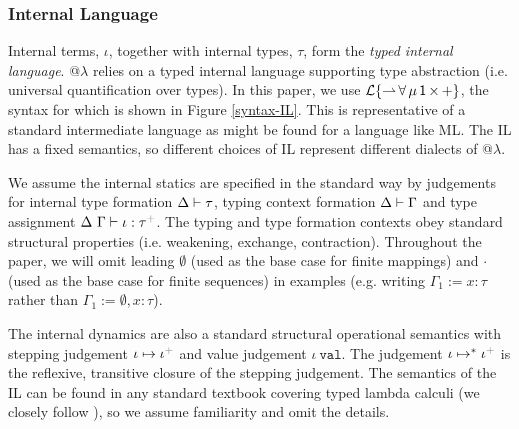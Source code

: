 \documentclass{llncs}
\newcommand{\moutput}{^{\color{gray}+}}
\begin{document}
\vspace{-10px}
\subsubsection{Internal Language} Internal terms, $\iota$, together with internal types, $\tau$, form the \emph{typed internal language}. @$\lambda$ relies on a typed internal language supporting type abstraction (i.e. universal quantification over types). In this paper, we use {$\mathcal{L}\{{\rightharpoonup}\,{\forall}\,{\mu}\,{{\sf 1}}\,{\times}\,{+}\}$}, the syntax for which is shown in Figure \ref{syntax-IL}. This is representative of a  standard intermediate language as might be found for a language like ML. The IL has a fixed semantics, so different choices of IL represent different dialects of @$\lambda$. 

We assume the internal statics are specified in the standard way by judgements for internal type formation {$\Delta \vdash \tau$}, typing context formation { $\Delta \vdash \Gamma$} and type assignment {$\iDelta~\iGamma \vdash \iota : \tau\moutput$}. The typing and type formation contexts obey standard structural properties (i.e. weakening, exchange, contraction). Throughout the paper, we will omit leading $\emptyset$ (used as the base case for finite mappings) and $\cdot$ (used as the base case for finite sequences) in examples (e.g. writing $\Gamma_\text{1} := x : \tau$ rather than $\Gamma_\text{1} := \emptyset, x : \tau$). 

The internal dynamics are also a standard structural operational semantics with stepping judgement {\small $\iota \mapsto \iota\moutput$} and value judgement {$\iota~\mathtt{val}$}. The judgement $\iota \mapsto^{*} \iota\moutput$ is the reflexive, transitive closure of the stepping judgement. The semantics of the IL can be found in any standard textbook covering typed lambda calculi (we closely follow \cite{pfpl}), so we assume familiarity and omit the details.

\end{document}
